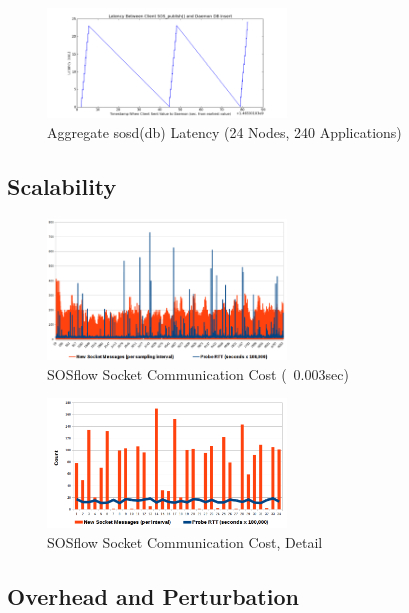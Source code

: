\begin{figure}[!t]
\centering
\includegraphics[width=2.5in]{images/aciss_latency_24_agg.png}
\caption{Aggregate sosd(db) Latency (24 Nodes, 240 Applications)}
\label{fig_sim}
\end{figure}



\subsection{Scalability}


\begin{figure}[!t]
\centering
\includegraphics[width=2.5in]{images/icebox_api_cost_when_slam.png}
\caption{SOSflow Socket Communication Cost (~0.003sec)}
\label{fig_sim}
\end{figure}


\begin{figure}[!t]
\centering
\includegraphics[width=2.5in]{images/icebox_api_cost_zoom.png}
\caption{SOSflow Socket Communication Cost, Detail}
\label{fig_sim}
\end{figure}




\subsection{Overhead and Perturbation}


